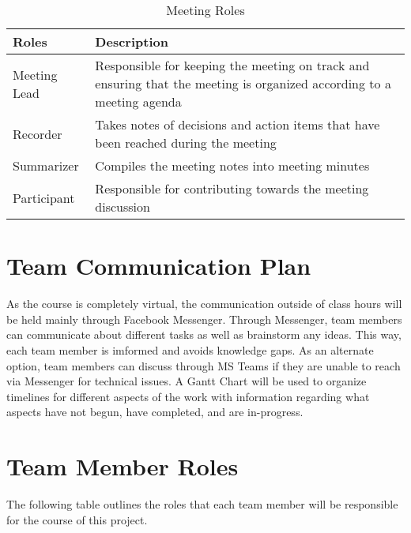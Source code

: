 \documentclass[12pt, titlepage]{article}
\begin{document}
\begin{table}[H]
    \centering
    \caption{{Meeting Roles}}
    \vspace{5pt}
    \begin{tabular}{|p{}|p{}|}
        \hline
        \textbf{{Roles}} & \textbf{{Description}}\\
        \hline
        Meeting Lead & {Responsible for keeping the meeting on track and ensuring that the meeting is organized according to a meeting agenda} \\
        \hline
        Recorder & {Takes notes of decisions and action items that have been reached during the meeting}\\
        \hline
        Summarizer & {Compiles the meeting notes into meeting minutes} \\
        \hline
        Participant & {Responsible for contributing towards the meeting discussion} \\
        \hline
    \end{tabular}
    
    \label{meetingRoles}
\end{table}

\section{Team Communication Plan}
As the course is completely virtual, the communication outside of class hours will be held mainly through Facebook Messenger. Through Messenger, team members can communicate about different tasks as well as brainstorm any ideas. This way, each team member is imformed and avoids knowledge gaps. As an alternate option, team members can discuss through MS Teams if they are unable to reach via Messenger for technical issues. A Gantt Chart will be used to organize timelines for different aspects of the work with information regarding what aspects have not begun, have completed, and are in-progress.

\newpage
\section{Team Member Roles}
The following table outlines the roles that each team member will be responsible for the course of this project.
\end{document}
